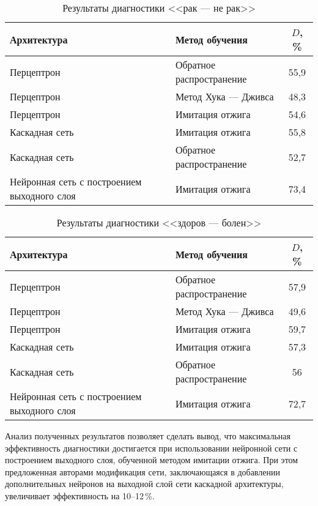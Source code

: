\begin{table}[h]
	\caption{Результаты диагностики <<рак --- не рак>>}
	\centering
	\label{tabluar:tabResults}\small
	\begin{tabular}{|l|l|c|}
	
		\hline
	Архитектура & {Метод обучения} &  $D$, \%  \\
		\hline
	Перцептрон & Обратное  распространение & 55,9   \\
		\hline
	Перцептрон & Метод Хука --- Дживса & 48,3   \\
		\hline
	Перцептрон & Имитация отжига & 54,6   \\
		\hline
	Каскадная сеть & Имитация отжига & 55,8   \\
		\hline
	
	Каскадная сеть & Обратное распространение & 52,7   \\
		\hline
		Нейронная сеть с построением выходного слоя & Имитация отжига & 73,4   \\
		\hline
	
	\end{tabular}
\end{table}


\begin{table}[h]
	\caption{Результаты диагностики <<здоров --- болен>>}
	\centering
	\label{tabluar:tabResults}\small
	\begin{tabular}{|l|l|c|}
		
		\hline
		{Архитектура} & {Метод обучения} &  $D$, \%  \\
		\hline
		Перцептрон & Обратное  распространение & 57,9   \\
		\hline
		Перцептрон & Метод Хука --- Дживса & 49,6   \\
		\hline
		Перцептрон & Имитация отжига & 59,7   \\
		\hline
		Каскадная сеть & Имитация отжига & 57,3   \\
		\hline
		
		Каскадная сеть & Обратное распространение & 56   \\
		\hline
		Нейронная сеть с построением выходного слоя & Имитация отжига & 72,7  \\
		\hline
		
	\end{tabular}
\end{table}

Анализ полученных результатов позволяет сделать вывод, что максимальная эффективность диагностики достигается при использовании нейронной сети с построением выходного слоя, обученной методом имитации отжига. При этом предложенная авторами модификация сети, заключающаяся в добавлении дополнительных нейронов на выходной слой сети каскадной архитектуры, увеличивает эффективность на 10--12\,\%.

